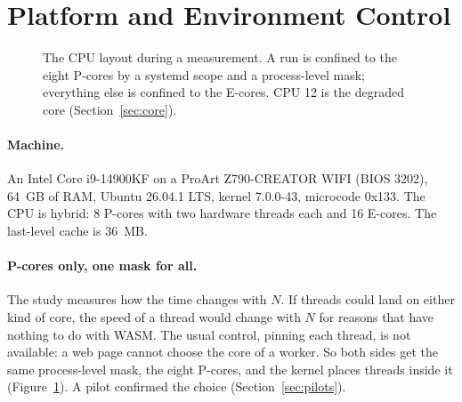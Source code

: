 \section{Platform and Environment Control}
\label{sec:platform}

\begin{figure}[t]
\centering
{}
\caption{The CPU layout during a measurement. A run is confined to the eight
P-cores by a systemd scope and a process-level mask; everything else is
confined to the E-cores. CPU 12 is the degraded core
(Section~\ref{sec:core}).}
\label{fig:cores}
\end{figure}

\paragraph{Machine.} An Intel Core i9-14900KF on a ProArt Z790-CREATOR
WIFI (BIOS 3202), 64~GB of RAM, Ubuntu 26.04.1 LTS, kernel 7.0.0-43,
microcode 0x133. The CPU is hybrid: 8 P-cores with two hardware threads
each and 16 E-cores. The last-level cache is 36~MB.

\paragraph{P-cores only, one mask for all.} The study measures how the time
changes with $N$. If threads could land on either kind of core, the speed of
a thread would change with $N$ for reasons that have nothing to do with
WASM. The usual control, pinning each thread, is not available: a web page
cannot choose the core of a worker. So both sides get the same
process-level mask, the eight P-cores, and the kernel places threads inside
it (Figure~\ref{fig:cores}). A pilot confirmed the choice
(Section~\ref{sec:pilots}).

